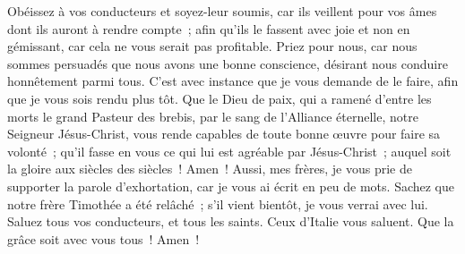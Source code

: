 \begin{multicols}{2}
Obéissez à vos conducteurs et soyez-leur soumis, car ils veillent pour vos âmes dont ils auront à rendre compte~; afin qu'ils le fassent avec joie et non en gémissant, car cela ne vous serait pas profitable.
 Priez pour nous, car nous sommes persuadés que nous avons une bonne conscience, désirant nous conduire honnêtement parmi tous.
C'est avec instance que je vous demande de le faire, afin que je vous sois rendu plus tôt.
Que le Dieu de paix, qui a ramené d'entre les morts le grand Pasteur des brebis, par le sang de l'Alliance éternelle, notre Seigneur Jésus-Christ,
vous rende capables de toute bonne œuvre pour faire sa volonté~; qu'il fasse en vous ce qui lui est agréable par Jésus-Christ~; auquel soit la gloire aux siècles des siècles~! Amen~!
Aussi, mes frères, je vous prie de supporter la parole d'exhortation, car je vous ai écrit en peu de mots.
Sachez que notre frère Timothée a été relâché~; s'il vient bientôt, je vous verrai avec lui.
Saluez tous vos conducteurs, et tous les saints. Ceux d'Italie vous saluent.
Que la grâce soit avec vous tous~! Amen~!
\PPE{}
\end{multicols}
